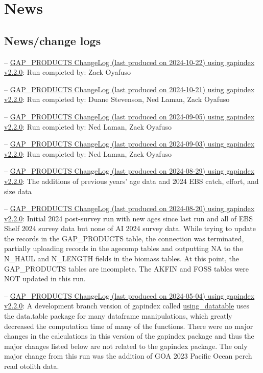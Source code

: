 \documentclass[
  letterpaper,
  oneside,
  open=any]{scrbook}
\begin{document}
\chapter{News}\label{news}

\section{News/change logs}\label{newschange-logs}

--
\href{https://raw.githubusercontent.com/afsc-gap-products/gap_products/main/content/intro-news/2024-10-22.txt}{GAP\_PRODUCTS
ChangeLog (last produced on 2024-10-22) using gapindex v2.2.0}: Run
completed by: Zack Oyafuso

--
\href{https://raw.githubusercontent.com/afsc-gap-products/gap_products/main/content/intro-news/2024-10-21.txt}{GAP\_PRODUCTS
ChangeLog (last produced on 2024-10-21) using gapindex v2.2.0}: Run
completed by: Duane Stevenson, Ned Laman, Zack Oyafuso

--
\href{https://raw.githubusercontent.com/afsc-gap-products/gap_products/main/content/intro-news/2024-09-05.txt}{GAP\_PRODUCTS
ChangeLog (last produced on 2024-09-05) using gapindex v2.2.0}: Run
completed by: Ned Laman, Zack Oyafuso

--
\href{https://raw.githubusercontent.com/afsc-gap-products/gap_products/main/content/intro-news/2024-09-03.txt}{GAP\_PRODUCTS
ChangeLog (last produced on 2024-09-03) using gapindex v2.2.0}: Run
completed by: Ned Laman, Zack Oyafuso

--
\href{https://raw.githubusercontent.com/afsc-gap-products/gap_products/main/content/intro-news/2024-08-29.txt}{GAP\_PRODUCTS
ChangeLog (last produced on 2024-08-29) using gapindex v2.2.0}: The
additions of previous years' age data and 2024 EBS catch, effort, and
size data

--
\href{https://raw.githubusercontent.com/afsc-gap-products/gap_products/main/content/intro-news/2024-08-20.txt}{GAP\_PRODUCTS
ChangeLog (last produced on 2024-08-20) using gapindex v2.2.0}: Initial
2024 post-survey run with new ages since last run and all of EBS Shelf
2024 survey data but none of AI 2024 survey data. While trying to update
the records in the GAP\_PRODUCTS table, the connection was terminated,
partially uploading records in the agecomp tables and outputting NA to
the N\_HAUL and N\_LENGTH fields in the biomass tables. At this point,
the GAP\_PRODUCTS tables are incomplete. The AKFIN and FOSS tables were
NOT updated in this run.

--
\href{https://raw.githubusercontent.com/afsc-gap-products/gap_products/main/content/intro-news/2024-05-04.txt}{GAP\_PRODUCTS
ChangeLog (last produced on 2024-05-04) using gapindex v2.2.0}: A
development branch version of gapindex called
\href{https://github.com/afsc-gap-products/gap_products/tree/using_datatable}{using\_datatable}
uses the data.table package for many dataframe manipulations, which
greatly decreased the computation time of many of the functions. There
were no major changes in the calculations in this version of the
gapindex package and thus the major changes listed below are not related
to the gapindex package. The only major change from this run was the
addition of GOA 2023 Pacific Ocean perch read otolith data.
\end{document}
